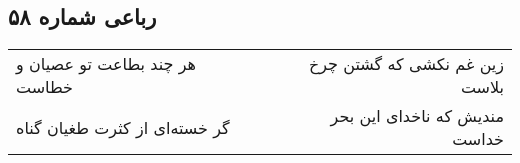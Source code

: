 \begin{center}
\section*{رباعی شماره ۵۸}
\label{sec:sh058}
\begin{longtable}{l p{0.5cm} r}
هر چند بطاعت تو عصیان و خطاست
&&
زین غم نکشی که گشتن چرخ بلاست
\\
گر خسته‌ای از کثرت طغیان گناه
&&
مندیش که ناخدای این بحر خداست
\\
\end{longtable}
\end{center}
